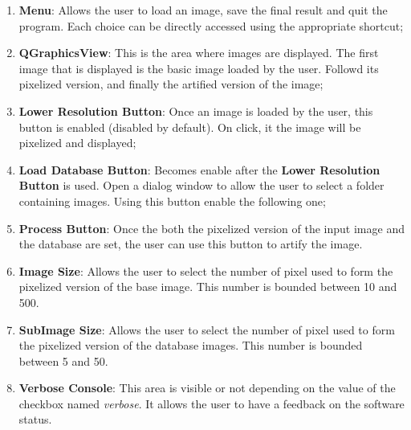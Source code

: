 \documentclass[aps,letterpaper,11pt]{revtex4}
\begin{document}
\begin{enumerate}
  \item \textbf{Menu}: Allows the user to load an image, save the final result and quit the program. Each choice can be directly accessed using the appropriate shortcut;
  \item \textbf{QGraphicsView}: This is the area where images are displayed. The first image that is displayed is the basic image loaded by the user. Followd its pixelized version, and finally the artified version of the image;
  \item\textbf{Lower Resolution Button}: Once an image is loaded by the user, this button is enabled (disabled by default). On click, it the image will be pixelized and displayed;
  \item \textbf{Load Database Button}: Becomes enable after the \textbf{Lower Resolution Button} is used. Open a dialog window to allow the user to select a folder containing images. Using this button enable the following one;
  \item \textbf{Process Button}: Once the both the pixelized version of the input image and the database are set, the user can use this button to artify the image.
  \item \textbf{Image Size}: Allows the user to select the number of pixel used to form the pixelized version of the base image. This number is bounded between 10 and 500.
  \item \textbf{SubImage Size}: Allows the user to select the number of pixel used to form the pixelized version of the database images. This number is bounded between 5 and 50.
  \item \textbf{Verbose Console}: This area is visible or not depending on the value of the checkbox named \textit{verbose}. It allows the user to have a feedback on the software status.
\end{enumerate}
\end{document}
